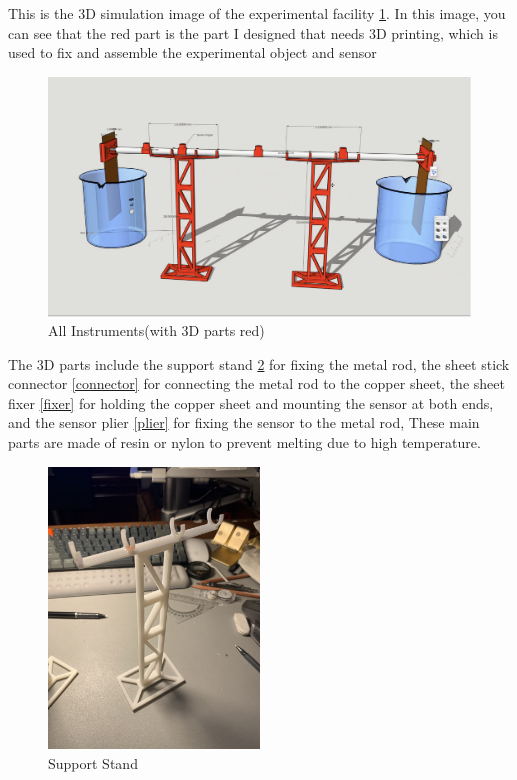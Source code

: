 \documentclass[12pt]{article}
\numberwithin{equation}{section}
\begin{document}
This is the 3D simulation image of the experimental facility \ref{all}. In this image, you can see that the red part is the part I designed that needs 3D printing, which is used to fix and assemble the experimental object and sensor

\begin{figure}[H]%
\centering %
\includegraphics[width=1\textwidth]{all.png} %
\caption{All Instruments(with 3D parts red)} %
\label{all}
\end{figure} 




The 3D parts include the support stand \ref{stand} for fixing the metal rod, the sheet stick connector \ref{connector} for connecting the metal rod to the copper sheet, the sheet fixer \ref{fixer} for holding the copper sheet and mounting the sensor at both ends, and the sensor plier \ref{plier} for fixing the sensor to the metal rod, These main parts are made of resin or nylon to prevent melting due to high temperature.


\begin{figure}[H]%
\centering %
\includegraphics[width=0.5\textwidth,angle=270]{support.JPG} %
\caption{Support Stand} %
\label{stand} 
\end{figure}
\end{document}
